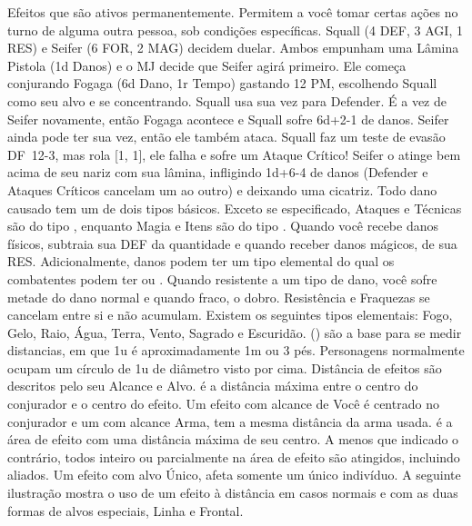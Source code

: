 Efeitos que são ativos permanentemente. \ofgap
{} Permitem a você tomar certas ações no turno de alguma outra pessoa, sob condições específicas.
%
\vfill
%
{
	Squall (4 DEF, 3 AGI, 1 RES) e Seifer (6 FOR, 2 MAG) decidem duelar. 
	Ambos empunham uma Lâmina Pistola (1d Danos) e o MJ decide que Seifer agirá primeiro. 
	Ele começa conjurando Fogaga (6d Dano, 1r Tempo) gastando 12 PM, escolhendo Squall como seu alvo e se concentrando. 
	Squall usa sua vez para Defender. 
	É a vez de Seifer novamente, então Fogaga acontece e Squall sofre \mbox{6d+2-1} de danos. 
	Seifer ainda pode ter sua vez, então ele também ataca. 
	Squall faz um teste de evasão \mbox{DF 12-3}, mas rola [1, 1], ele falha e sofre um Ataque Crítico! 
	Seifer o atinge bem acima de seu nariz com sua lâmina, infligindo \mbox{1d+6-4} de danos (Defender e Ataques Críticos cancelam um ao outro) e deixando uma cicatriz.
}
%
\clearpage
%
\newcommand{\elemicon}[1]{\hspace*{-0.14cm}#1\hspace*{-0.14cm}}
Todo dano causado tem um de dois tipos básicos. 
Exceto se especificado, Ataques e Técnicas são do tipo , enquanto Magia e Itens são do tipo . 
Quando você recebe danos físicos, subtraia sua DEF da quantidade e quando receber danos mágicos, de sua RES. 
Adicionalmente, danos podem ter um tipo elemental do qual os combatentes podem ter  ou . 
Quando resistente a um tipo de dano, você sofre metade do dano normal e quando fraco, o dobro. 
Resistência e Fraquezas se cancelam entre si e não acumulam. Existem os seguintes tipos elementais: Fogo, Gelo, Raio, Água, Terra, Vento, Sagrado e Escuridão.
%
\vfill
%
 () são a base para se medir distancias, em que 1u é aproximadamente 1m ou 3 pés. 
Personagens normalmente ocupam um círculo de 1u de diâmetro visto por cima. 
Distância de efeitos são descritos pelo seu Alcance e Alvo. 
 é a distância máxima entre o centro do conjurador e o centro do efeito. 
Um efeito com alcance de Você é centrado no conjurador e um com alcance Arma, tem a mesma distância da arma usada. 
 é a área de efeito com uma distância máxima de seu centro. A menos que indicado o contrário, todos inteiro ou parcialmente na área de efeito são atingidos, incluindo aliados. 
Um efeito com alvo Único, afeta somente um único indivíduo. A seguinte ilustração mostra o uso de um efeito à distância em casos normais e com as duas formas de alvos especiais, Linha e Frontal.
